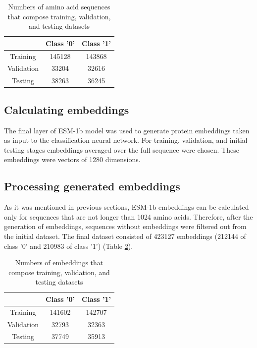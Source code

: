 \documentclass[12pt]{report}
\begin{document}
	\begin{table}[h!]
		\caption{Numbers of amino acid sequences that compose training, 
		validation, and testing datasets}
		\vspace{0.2cm}
		\centering
		\begin{tabular}{ | c | c | c | }
			\hline 
			& Class '0' & Class '1' \\
			\hline 
			Training & 145128 & 143868 \\
			\hline  
			Validation & 33204 & 32616 \\
			\hline 
			Testing & 38263 & 36245 \\
			\hline    
		\end{tabular}
		\label{table:sequences003}
	\end{table}

	\subsection{Calculating embeddings}

	The final layer of ESM-1b model was used to generate protein embeddings
	taken as input to the classification neural network. For training, validation,
	and initial testing stages embeddings averaged over the full sequence were
	chosen. These embeddings were vectors of 1280 dimensions.

	\subsection{Processing generated embeddings}

	As it was mentioned in previous sections, ESM-1b embeddings can be 
	calculated only for sequences that are not longer than 1024 amino acids.
	Therefore, after the generation of embeddings, sequences without embeddings 
	were filtered out from the initial dataset. The final dataset consisted
	of 423127 embeddings (212144 of class '0' and 210983 of class '1') (Table 
	\ref{table:embeddings003}).

	\begin{table}[h!]
		\caption{Numbers of embeddings that compose training, 
		validation, and testing datasets}
		\vspace{0.2cm}
		\centering
		\begin{tabular}{ | c | c | c | }
			\hline 
			& Class '0' & Class '1' \\
			\hline 
			Training & 141602 & 142707 \\
			\hline  
			Validation & 32793 & 32363 \\
			\hline 
			Testing & 37749 & 35913 \\
			\hline    
		\end{tabular}
		\label{table:embeddings003}
	\end{table}
\end{document}

